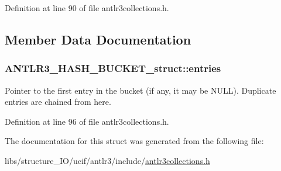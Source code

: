 Definition at line 90 of file antlr3collections.\-h.



\subsection{Member Data Documentation}
\hypertarget{struct_a_n_t_l_r3___h_a_s_h___b_u_c_k_e_t__struct_afb3fca56096d22730d56e3347c76d5d8}{
\subsubsection[{entries}]{ A\-N\-T\-L\-R3\-\_\-\-H\-A\-S\-H\-\_\-\-B\-U\-C\-K\-E\-T\-\_\-struct\-::entries}}\label{struct_a_n_t_l_r3___h_a_s_h___b_u_c_k_e_t__struct_afb3fca56096d22730d56e3347c76d5d8}
Pointer to the first entry in the bucket (if any, it may be N\-U\-L\-L). Duplicate entries are chained from here. 

Definition at line 96 of file antlr3collections.\-h.



The documentation for this struct was generated from the following file\-:\begin{DoxyCompactItemize}
\item 
libs/structure\-\_\-\-I\-O/ucif/antlr3/include/\hyperlink{antlr3collections_8h}{antlr3collections.\-h}\end{DoxyCompactItemize}
